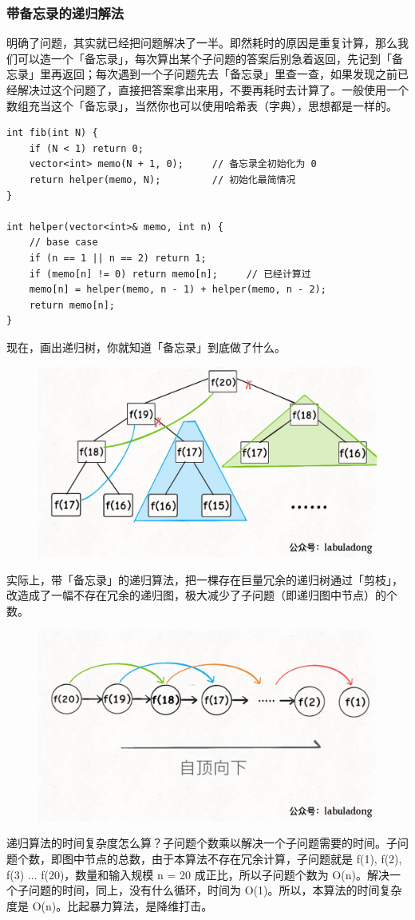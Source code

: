 \documentclass[12pt]{article}
\begin{document}
\subsubsection{带备忘录的递归解法}
明确了问题，其实就已经把问题解决了一半。即然耗时的原因是重复计算，那么我们可以造一个「备忘录」，每次算出某个子问题的答案后别急着返回，先记到「备忘录」里再返回；每次遇到一个子问题先去「备忘录」里查一查，如果发现之前已经解决过这个问题了，直接把答案拿出来用，不要再耗时去计算了。一般使用一个数组充当这个「备忘录」，当然你也可以使用哈希表（字典），思想都是一样的。
\begin{lstlisting}
int fib(int N) {
    if (N < 1) return 0;
    vector<int> memo(N + 1, 0);     // 备忘录全初始化为 0
    return helper(memo, N); 	    // 初始化最简情况
}
 
int helper(vector<int>& memo, int n) {
    // base case 
    if (n == 1 || n == 2) return 1;
    if (memo[n] != 0) return memo[n];     // 已经计算过
    memo[n] = helper(memo, n - 1) + helper(memo, n - 2);
    return memo[n];
}
\end{lstlisting}
现在，画出递归树，你就知道「备忘录」到底做了什么。
\begin{figure}[H]
    \centering
    \includegraphics[width=.5\textwidth]{fig/Dynamic_Programming_Recursion_Tree_2.jpg}
\end{figure}

实际上，带「备忘录」的递归算法，把一棵存在巨量冗余的递归树通过「剪枝」，改造成了一幅不存在冗余的递归图，极大减少了子问题（即递归图中节点）的个数。
\begin{figure}[H]
    \centering
    \includegraphics[width=.5\textwidth]{fig/Dynamic_Programming_Recursion_Tree_3.jpg}
\end{figure}

递归算法的时间复杂度怎么算？子问题个数乘以解决一个子问题需要的时间。子问题个数，即图中节点的总数，由于本算法不存在冗余计算，子问题就是 f(1), f(2), f(3) ... f(20)，数量和输入规模 n = 20 成正比，所以子问题个数为 O(n)。解决一个子问题的时间，同上，没有什么循环，时间为 O(1)。所以，本算法的时间复杂度是 O(n)。比起暴力算法，是降维打击。
\end{document}
